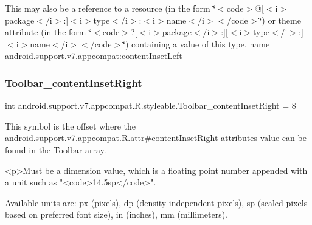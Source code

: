 This may also be a reference to a resource (in the form \char`\"{}$<$code$>$@\mbox{[}$<$i$>$package$<$/i$>$\+:\mbox{]}$<$i$>$type$<$/i$>$\+:$<$i$>$name$<$/i$>$$<$/code$>$\char`\"{}) or theme attribute (in the form \char`\"{}$<$code$>$?\mbox{[}$<$i$>$package$<$/i$>$\+:\mbox{]}\mbox{[}$<$i$>$type$<$/i$>$\+:\mbox{]}$<$i$>$name$<$/i$>$$<$/code$>$\char`\"{}) containing a value of this type.  name android.\+support.\+v7.\+appcompat\+:content\+Inset\+Left \mbox{\label{classandroid_1_1support_1_1v7_1_1appcompat_1_1R_1_1styleable_a8195e4a7fe77915a6f6fda3aec2831c8}} 
\subsubsection{\texorpdfstring{Toolbar\+\_\+content\+Inset\+Right}{Toolbar\_contentInsetRight}}
{\footnotesize\ttfamily int android.\+support.\+v7.\+appcompat.\+R.\+styleable.\+Toolbar\+\_\+content\+Inset\+Right = 8\hspace{0.3cm}{\ttfamily [static]}}

This symbol is the offset where the \hyperlink{classandroid_1_1support_1_1v7_1_1appcompat_1_1R_1_1attr_a608654504a7bff330119bfa1462d385a}{android.\+support.\+v7.\+appcompat.\+R.\+attr\#content\+Inset\+Right} attribute\textquotesingle{}s value can be found in the \hyperlink{classandroid_1_1support_1_1v7_1_1appcompat_1_1R_1_1styleable_a2daba9587ef9f700f2d54cf13435cb32}{Toolbar} array.

\begin{DoxyVerb}      <p>Must be a dimension value, which is a floating point number appended with a unit such as "<code>14.5sp</code>".
\end{DoxyVerb}
 Available units are\+: px (pixels), dp (density-\/independent pixels), sp (scaled pixels based on preferred font size), in (inches), mm (millimeters). 

